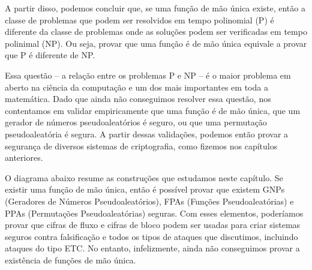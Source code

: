 A partir disso, podemos concluir que, se uma função de mão única existe, então a classe de problemas que podem ser resolvidos em tempo polinomial (P) é diferente da classe de problemas onde as soluções podem ser verificadas em tempo polinimal (NP).
Ou seja, provar que uma função é de mão única equivale a provar que P é diferente de NP.

Essa questão -- a relação entre os problemas P e NP -- é o maior problema em aberto na ciência da computação e um dos mais importantes em toda a matemática.
Dado que ainda não conseguimos resolver essa questão, nos contentamos em validar empiricamente que uma função é de mão única, que um gerador de números pseudoaleatórios é seguro, ou que uma permutação pseudoaleatória é segura.
A partir dessas validações, podemos então provar a segurança de diversos sistemas de criptografia, como fizemos nos capítulos anteriores.

O diagrama abaixo resume as construções que estudamos neste capítulo.
Se existir uma função de mão única, então é possível provar que existem GNPs (Geradores de Números Pseudoaleatórios), FPAs (Funções Pseudoaleatórias) e PPAs (Permutações Pseudoaleatórias) seguras.
Com esses elementos, poderíamos provar que cifras de fluxo e cifras de bloco podem ser usadas para criar sistemas seguros contra falsificação e todos os tipos de ataques que discutimos, incluindo ataques do tipo ETC.
No entanto, infelizmente, ainda não conseguimos provar a existência de funções de mão única.


\begin{center}
\end{center}


